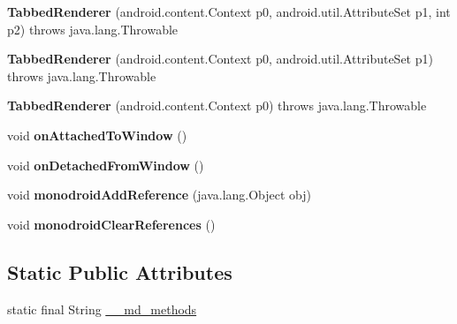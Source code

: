 \begin{DoxyCompactItemize}
\item 
\mbox{\label{classmd5b60ffeb829f638581ab2bb9b1a7f4f3f_1_1_tabbed_renderer_a58094d971cda65d13a4494b4c01d6606}} 
{\bfseries Tabbed\+Renderer} (android.\+content.\+Context p0, android.\+util.\+Attribute\+Set p1, int p2)  throws java.\+lang.\+Throwable 	
\item 
\mbox{\label{classmd5b60ffeb829f638581ab2bb9b1a7f4f3f_1_1_tabbed_renderer_a3b8fd0e5dc0df3553dda11d43292045a}} 
{\bfseries Tabbed\+Renderer} (android.\+content.\+Context p0, android.\+util.\+Attribute\+Set p1)  throws java.\+lang.\+Throwable 	
\item 
\mbox{\label{classmd5b60ffeb829f638581ab2bb9b1a7f4f3f_1_1_tabbed_renderer_a1e7ca4d75fddda52cec47dee49875855}} 
{\bfseries Tabbed\+Renderer} (android.\+content.\+Context p0)  throws java.\+lang.\+Throwable 	
\item 
\mbox{\label{classmd5b60ffeb829f638581ab2bb9b1a7f4f3f_1_1_tabbed_renderer_a1e20c6fb1a9e43d31e453be14845d61b}} 
void {\bfseries on\+Attached\+To\+Window} ()
\item 
\mbox{\label{classmd5b60ffeb829f638581ab2bb9b1a7f4f3f_1_1_tabbed_renderer_a5ff59fab206273b68a92840b279acd12}} 
void {\bfseries on\+Detached\+From\+Window} ()
\item 
\mbox{\label{classmd5b60ffeb829f638581ab2bb9b1a7f4f3f_1_1_tabbed_renderer_a1ac0d0bc3f7d31327bd95fbf0ddf533c}} 
void {\bfseries monodroid\+Add\+Reference} (java.\+lang.\+Object obj)
\item 
\mbox{\label{classmd5b60ffeb829f638581ab2bb9b1a7f4f3f_1_1_tabbed_renderer_a798c70a93fbc1b979f670015b6d12ed9}} 
void {\bfseries monodroid\+Clear\+References} ()
\end{DoxyCompactItemize}
\subsection*{Static Public Attributes}
\begin{DoxyCompactItemize}
\item 
static final String \hyperlink{classmd5b60ffeb829f638581ab2bb9b1a7f4f3f_1_1_tabbed_renderer_a38151846bc49cd1f6a91896a729a40ec}{\+\_\+\+\_\+md\+\_\+methods}
\end{DoxyCompactItemize}


